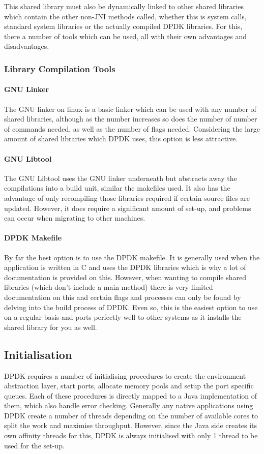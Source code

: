 \documentclass[final_report.tex]{subfiles}
\begin{document}
This shared library must also be dynamically linked to other shared libraries which contain the other non-JNI methods called, whether this is system calls, standard system libraries or the actually compiled DPDK libraries. For this, there a number of tools which can be used, all with their own advantages and disadvantages.

\subsubsection{Library Compilation Tools}

\paragraph*{GNU Linker}
The GNU linker on linux is a basic linker which can be used with any number of shared libraries, although as the number increases so does the number of number of commands needed, as well as the number of flags needed. Considering the large amount of shared libraries which DPDK uses, this option is less attractive.

\paragraph*{GNU Libtool}
The GNU Libtool uses the GNU linker underneath but abstracts away the compilations into a build unit, similar the makefiles used. It also has the advantage of only recompiling those libraries required if certain source files are updated. However, it does require a significant amount of set-up, and problems can occur when migrating to other machines.

\paragraph*{DPDK Makefile}
By far the best option is to use the DPDK makefile. It is generally used when the application is written in C and uses the DPDK libraries which is why a lot of documentation is provided on this. However, when wanting to compile shared libraries (which don't include a main method) there is very limited documentation on this and certain flags and processes can only be found by delving into the build process of DPDK. Even so, this is the easiest option to use on a regular basis and ports perfectly well to other systems as it installs the shared library for you as well.

\subsection{Initialisation}
DPDK requires a number of initialising procedures to create the environment abstraction layer, start ports, allocate memory pools and setup the port specific queues. Each of these procedures is directly mapped to a Java implementation of them, which also handle error checking. Generally any native applications using DPDK create a number of threads depending on the number of available cores to split the work and maximise throughput. However, since the Java side creates its own affinity threads for this, DPDK is always initialised with only 1 thread to be used for the set-up.
\end{document}
